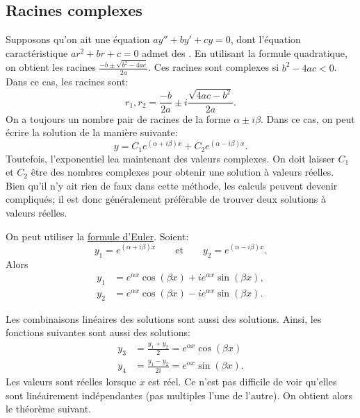 \subsection{Racines complexes}

Supposons qu'on ait une équation  $ay'' + by' + cy = 0$, dont  l'équation caractéristique 
$a r^2 + b r + c = 0$ admet des .
En utilisant la formule quadratique, on obtient les racines 
$\frac{-b \pm \sqrt{b^2 - 4ac}}{2a}$.
Ces racines sont complexes si $b^2 - 4ac < 0$.  Dans ce cas, les racines sont:
\begin{equation*}
r_1, r_2 = \frac{-b}{2a} \pm i\frac{\sqrt{4ac - b^2}}{2a} .
\end{equation*}
On a toujours un nombre pair de racines de la forme $\alpha \pm i
\beta$. Dans ce cas, on peut écrire la solution de la manière suivante:
\begin{equation*}
y = C_1 e^{(\alpha+i\beta)x} + C_2 e^{(\alpha-i\beta)x} .
\end{equation*}
Toutefois, l'exponentiel lea maintenant des valeurs complexes. On doit laisser  
$C_1$ et $C_2$ être des nombres complexes pour obtenir une solution à valeurs réelles. Bien qu'il n'y ait rien de faux dans cette méthode, les calculs peuvent devenir compliqués; il est donc généralement préférable de trouver deux solutions à valeurs réelles.

On peut utiliser la  \hyperref[eulersformula]{formule d'Euler}. Soient: 
\begin{equation*}
y_1 = e^{(\alpha+i\beta)x} \qquad \text{et} \qquad y_2 = e^{(\alpha-i\beta)x} .
\end{equation*}
Alors 
\begin{align*}
y_1 & = e^{\alpha x} \cos (\beta x) + i e^{\alpha x} \sin (\beta x) , \\
y_2 & = e^{\alpha x} \cos (\beta x) - i e^{\alpha x} \sin (\beta x) .
\end{align*}

Les combinaisons linéaires des solutions sont aussi des solutions. Ainsi, les fonctions suivantes sont aussi des solutions:
\begin{align*}
y_3 & = \frac{y_1 + y_2}{2} = e^{\alpha x} \cos (\beta x)  \\ 
y_4 & = \frac{y_1 - y_2}{2i} = e^{\alpha x} \sin (\beta x) .
\end{align*}
Les valeurs sont réelles lorsque $x$ est réel. Ce n'est pas difficile de voir qu'elles sont linéairement indépendantes (pas multiples l'une de l'autre). On obtient alors le théorème suivant.

